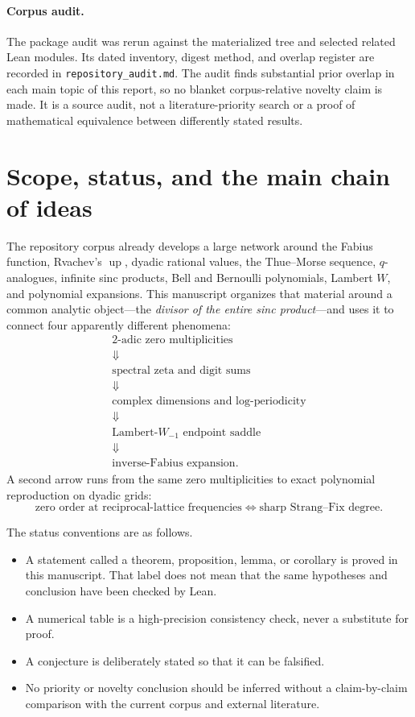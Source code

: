 \documentclass[11pt,oneside]{article}
\theoremstyle{definition}
\theoremstyle{remark}
\newcommand{\Up}{\operatorname{up}}
\begin{document}
\paragraph{Corpus audit.}
The package audit was rerun against the materialized
 tree and selected related Lean modules.
Its dated inventory, digest method, and overlap register are recorded in
\texttt{repository\_audit.md}.  The audit finds substantial prior overlap in
each main topic of this report, so no blanket corpus-relative novelty claim is
made.  It is a source audit, not a literature-priority search or a proof of
mathematical equivalence between differently stated results.

\tableofcontents

\section{Scope, status, and the main chain of ideas}

The repository corpus already develops a large network around the Fabius
function, Rvachev's \(\Up\), dyadic rational values, the Thue--Morse
sequence, \(q\)-analogues, infinite sinc products, Bell and Bernoulli
polynomials, Lambert \(W\), and polynomial expansions.  This manuscript
organizes that material around a common analytic object---the \emph{divisor
of the entire sinc product}---and uses it to connect four apparently
different phenomena:
\[
\boxed{
\begin{array}{c}
\text{\(2\)-adic zero multiplicities}\\
\Downarrow\\
\text{spectral zeta and digit sums}\\
\Downarrow\\
\text{complex dimensions and log-periodicity}\\
\Downarrow\\
\text{Lambert-\(W_{-1}\) endpoint saddle}\\
\Downarrow\\
\text{inverse-Fabius expansion}.
\end{array}}
\]
A second arrow runs from the same zero multiplicities to exact polynomial
reproduction on dyadic grids:
\[
 \text{zero order at reciprocal-lattice frequencies}
 \Longleftrightarrow
 \text{sharp Strang--Fix degree}.
\]

The status conventions are as follows.

\begin{itemize}[leftmargin=2em]
\item A statement called a theorem, proposition, lemma, or corollary is proved
      in this manuscript.  That label does not mean that the same hypotheses
      and conclusion have been checked by Lean.
\item A numerical table is a high-precision consistency check, never a
      substitute for proof.
\item A conjecture is deliberately stated so that it can be falsified.
\item No priority or novelty conclusion should be inferred without a
      claim-by-claim comparison with the current corpus and external
      literature.
\end{itemize}
\end{document}
